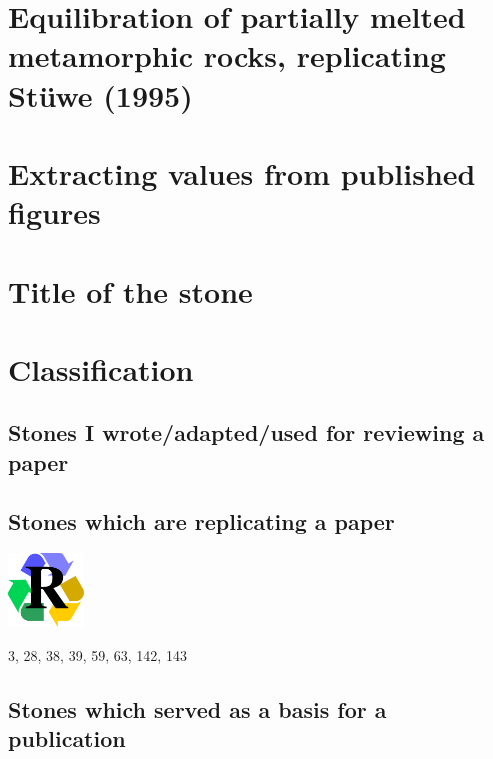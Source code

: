 \documentclass[a4paper,11pt]{report}
\begin{document}
\chapter{Equilibration of partially melted metamorphic rocks, replicating St{\"u}we (1995) \label{f169}} %

\chapter{Extracting values from published figures \label{f170}} %




\chapter{Title of the stone}

\appendix
\chapter{Classification}

\section{
Stones I wrote/adapted/used for reviewing a paper}

\section{
Stones which are replicating a paper}

\includegraphics[width=2cm]{images/pictograms/replication}

3, 28, 38, 39, 59, 63, 142, 143

\section{
Stones which served as a basis for a publication}
\end{document}
